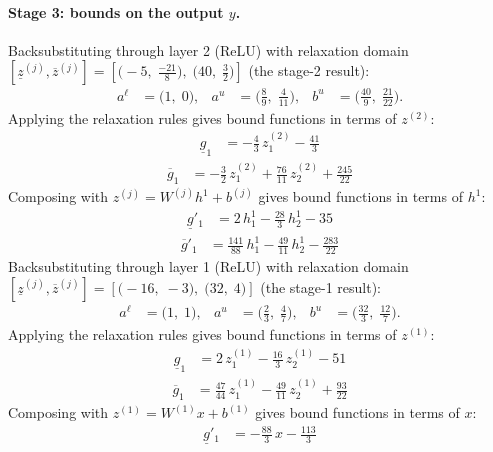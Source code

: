 \documentclass[11pt]{article}
\begin{document}
\paragraph{Stage 3: bounds on the output $y$.}
Backsubstituting through layer 2 (ReLU) with relaxation domain $[\underline{z}^{(j)}, \overline{z}^{(j)}] = [\bigl(-5,\; \frac{-21}{8}\bigr),\; \bigl(40,\; \frac{3}{2}\bigr)]$ (the stage-2 result):
\begin{align*}
a^{\ell} &= \bigl(1,\; 0\bigr), & a^{u} &= \bigl(\frac{8}{9},\; \frac{4}{11}\bigr), & b^{u} &= \bigl(\frac{40}{9},\; \frac{21}{22}\bigr).
\end{align*}
Applying the relaxation rules gives bound functions in terms of $z^{(2)}$:
\begin{align*}
\underline{g}_{1} &= -\frac{4}{3}\,z^{(2)}_{1} - \frac{41}{3}
\end{align*}
\begin{align*}
\overline{g}_{1} &= -\frac{3}{2}\,z^{(2)}_{1} + \frac{76}{11}\,z^{(2)}_{2} + \frac{245}{22}
\end{align*}
Composing with $z^{(j)} = W^{(j)} h^{1} + b^{(j)}$ gives bound functions in terms of $h^{1}$:
\begin{align*}
\underline{g}'_{1} &= 2\,h^{1}_{1} - \frac{28}{3}\,h^{1}_{2} - 35
\end{align*}
\begin{align*}
\overline{g}'_{1} &= \frac{141}{88}\,h^{1}_{1} - \frac{49}{11}\,h^{1}_{2} - \frac{283}{22}
\end{align*}
Backsubstituting through layer 1 (ReLU) with relaxation domain $[\underline{z}^{(j)}, \overline{z}^{(j)}] = [\bigl(-16,\; -3\bigr),\; \bigl(32,\; 4\bigr)]$ (the stage-1 result):
\begin{align*}
a^{\ell} &= \bigl(1,\; 1\bigr), & a^{u} &= \bigl(\frac{2}{3},\; \frac{4}{7}\bigr), & b^{u} &= \bigl(\frac{32}{3},\; \frac{12}{7}\bigr).
\end{align*}
Applying the relaxation rules gives bound functions in terms of $z^{(1)}$:
\begin{align*}
\underline{g}_{1} &= 2\,z^{(1)}_{1} - \frac{16}{3}\,z^{(1)}_{2} - 51
\end{align*}
\begin{align*}
\overline{g}_{1} &= \frac{47}{44}\,z^{(1)}_{1} - \frac{49}{11}\,z^{(1)}_{2} + \frac{93}{22}
\end{align*}
Composing with $z^{(1)} = W^{(1)} x + b^{(1)}$ gives bound functions in terms of $x$:
\begin{align*}
\underline{g}'_{1} &= -\frac{88}{3}\,x - \frac{113}{3}
\end{align*}
\end{document}

